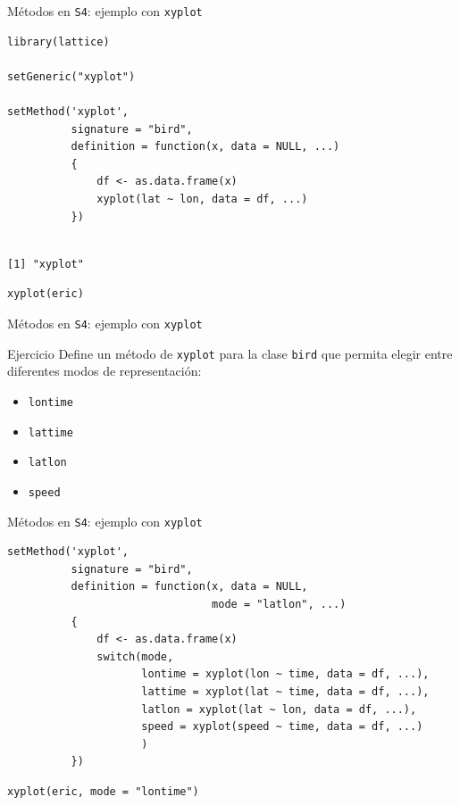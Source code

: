 \documentclass[xcolor={usenames,svgnames,dvipsnames}]{beamer}
\begin{document}
\begin{frame}[label={sec:orga4c8531},fragile]{Métodos en \texttt{S4}: ejemplo con \texttt{xyplot}}
 \lstset{language=r,label= ,caption= ,captionpos=b,numbers=none}
\begin{lstlisting}
library(lattice)

setGeneric("xyplot")

setMethod('xyplot',
          signature = "bird",
          definition = function(x, data = NULL, ...)
          {
              df <- as.data.frame(x)
              xyplot(lat ~ lon, data = df, ...)
          })    
\end{lstlisting}

\begin{verbatim}

[1] "xyplot"
\end{verbatim}


\lstset{language=r,label= ,caption= ,captionpos=b,numbers=none}
\begin{lstlisting}
xyplot(eric)
\end{lstlisting}
\end{frame}


\begin{frame}[label={sec:org0d8caae},fragile]{Métodos en \texttt{S4}: ejemplo con \texttt{xyplot}}
 \begin{block}{Ejercicio}
Define un método de \texttt{xyplot} para la clase \texttt{bird} que permita elegir entre diferentes modos de representación:
\begin{itemize}
\item \texttt{lontime}
\item \texttt{lattime}
\item \texttt{latlon}
\item \texttt{speed}
\end{itemize}
\end{block}
\end{frame}

\begin{frame}[label={sec:org2ff35d9},fragile]{Métodos en \texttt{S4}: ejemplo con \texttt{xyplot}}
 \lstset{language=r,label= ,caption= ,captionpos=b,numbers=none}
\begin{lstlisting}
setMethod('xyplot',
          signature = "bird",
          definition = function(x, data = NULL,
                                mode = "latlon", ...)
          {
              df <- as.data.frame(x)
              switch(mode,
                     lontime = xyplot(lon ~ time, data = df, ...),
                     lattime = xyplot(lat ~ time, data = df, ...),
                     latlon = xyplot(lat ~ lon, data = df, ...),
                     speed = xyplot(speed ~ time, data = df, ...)
                     )
          })    
\end{lstlisting}

\lstset{language=r,label= ,caption= ,captionpos=b,numbers=none}
\begin{lstlisting}
xyplot(eric, mode = "lontime")
\end{lstlisting}
\end{frame}
\end{document}
